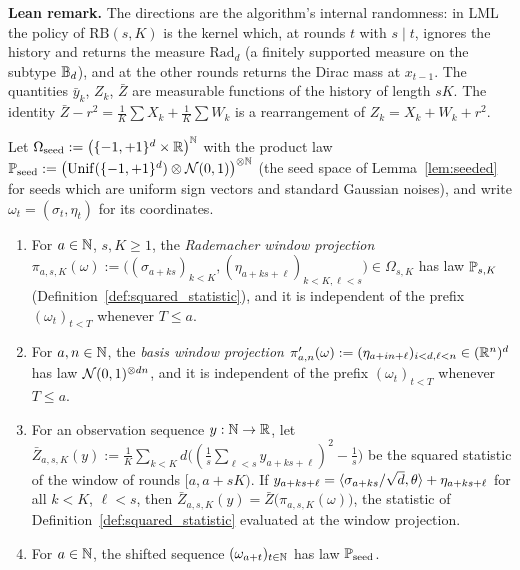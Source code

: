 \textbf{Lean remark.} The directions are the algorithm's internal randomness: in LML the
policy of $\mathrm{RB}(s,K)$ is the kernel which, at rounds $t$ with $s \mid t$, ignores the
history and returns the measure $\mathrm{Rad}_d$ (a finitely supported measure on the
subtype $\mathbb{B}_d$), and at the other rounds returns the Dirac mass at $x_{t-1}$. The
quantities $\bar y_k$, $Z_k$, $\bar Z$ are measurable functions of the history of length
$sK$. The identity $\bar Z - r^2 = \frac1K\sum X_k + \frac1K\sum W_k$ is a rearrangement of
$Z_k = X_k + W_k + r^2$.

\begin{lemma}\label{lem:statistic_structure}
\leanok
{}
Let $\Omega_{\mathrm{seed}} := \big(\{-1,+1\}^d \times \mathbb{R}\big)^{\mathbb{N}}$ with the product law
$\mathbb{P}_{\mathrm{seed}} := \big(\mathrm{Unif}(\{-1,+1\}^d) \otimes \mathcal{N}(0,1)\big)^{\otimes\mathbb{N}}$
(the seed space of Lemma~\ref{lem:seeded} for seeds which are uniform sign vectors and
standard Gaussian noises), and write $\omega_t = (\sigma_t, \eta_t)$ for its coordinates.
\begin{enumerate}
  \item[(i)] For $a \in \mathbb{N}$, $s, K \ge 1$, the \emph{Rademacher window projection}
    $\pi_{a,s,K}(\omega) := \big( (\sigma_{a+ks})_{k<K}, (\eta_{a+ks+\ell})_{k<K,\ell<s} \big)
    \in \Omega_{s,K}$ has law $\mathbb{P}_{s,K}$ (Definition~\ref{def:squared_statistic}), and it
    is independent of the prefix $(\omega_t)_{t<T}$ whenever $T \le a$.
  \item[(ii)] For $a, n \in \mathbb{N}$, the \emph{basis window projection}
    $\pi'_{a,n}(\omega) := (\eta_{a+in+\ell})_{i<d,\ell<n} \in (\mathbb{R}^n)^d$ has law
    $\mathcal{N}(0,1)^{\otimes dn}$, and it is independent of the prefix $(\omega_t)_{t<T}$
    whenever $T \le a$.
  \item[(iii)] For an observation sequence $y : \mathbb{N} \to \mathbb{R}$, let
    $\bar Z_{a,s,K}(y) := \frac1K\sum_{k<K} d\big( (\frac1s\sum_{\ell<s} y_{a+ks+\ell})^2 - \frac1s \big)$
    be the squared statistic of the window of rounds $[a, a + sK)$. If
    $y_{a+ks+\ell} = \langle \sigma_{a+ks}/\sqrt d, \theta \rangle + \eta_{a+ks+\ell}$ for all $k < K$,
    $\ell < s$, then $\bar Z_{a,s,K}(y) = \bar Z\big(\pi_{a,s,K}(\omega)\big)$, the statistic of
    Definition~\ref{def:squared_statistic} evaluated at the window projection.
  \item[(iv)] For $a \in \mathbb{N}$, the shifted sequence $(\omega_{a+t})_{t\in\mathbb{N}}$ has law
    $\mathbb{P}_{\mathrm{seed}}$.
\end{enumerate}
\end{lemma}


